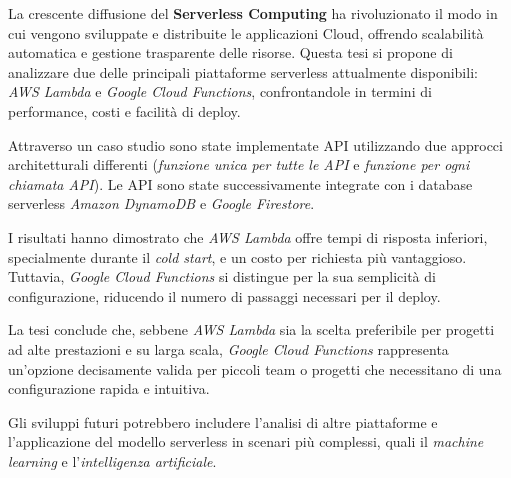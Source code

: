 La crescente diffusione del \textbf{Serverless Computing} ha rivoluzionato il modo in cui vengono sviluppate e distribuite le applicazioni Cloud, offrendo scalabilità automatica e gestione trasparente delle risorse. Questa tesi si propone di analizzare due delle principali piattaforme serverless attualmente disponibili: \textit{AWS Lambda} e \textit{Google Cloud Functions}, confrontandole in termini di performance, costi e facilità di deploy.

Attraverso un caso studio sono state implementate API utilizzando due approcci architetturali differenti (\textit{funzione unica per tutte le API} e \textit{funzione per ogni chiamata API}). Le API sono state successivamente integrate con i database serverless \textit{Amazon DynamoDB} e \textit{Google Firestore}. 

I risultati hanno dimostrato che \textit{AWS Lambda} offre tempi di risposta inferiori, specialmente durante il \textit{cold start}, e un costo per richiesta più vantaggioso. Tuttavia, \textit{Google Cloud Functions} si distingue per la sua semplicità di configurazione, riducendo il numero di passaggi necessari per il deploy.

La tesi conclude che, sebbene \textit{AWS Lambda} sia la scelta preferibile per progetti ad alte prestazioni e su larga scala, \textit{Google Cloud Functions} rappresenta un'opzione decisamente valida per piccoli team o progetti che necessitano di una configurazione rapida e intuitiva. 

Gli sviluppi futuri potrebbero includere l'analisi di altre piattaforme e l'applicazione del modello serverless in scenari più complessi, quali il \textit{machine learning} e l'\textit{intelligenza artificiale}.